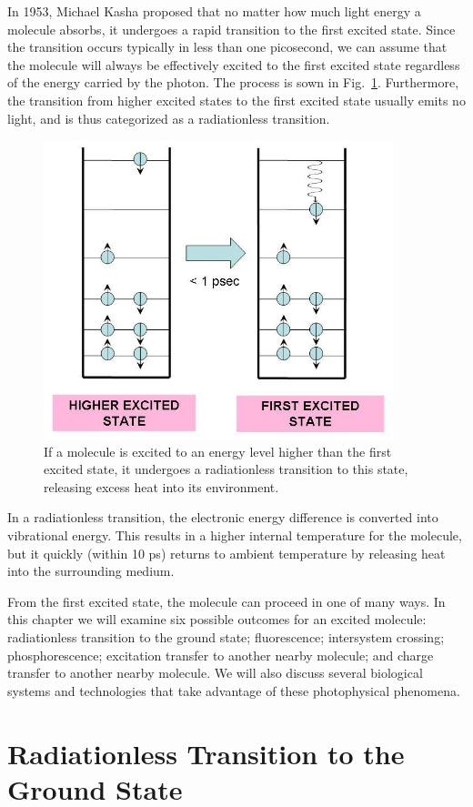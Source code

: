  In 1953, Michael Kasha proposed that no matter how much light energy a molecule absorbs, it undergoes a rapid transition to the first excited state.  Since the transition occurs typically in less than one picosecond, we can assume that the molecule will always be effectively excited to the first excited state regardless of the energy carried by the photon. The process is sown in Fig.~\ref{Fig7-1}. Furthermore, the transition from higher excited states to the first excited state usually emits no light, and is thus categorized as a radiationless transition.
\begin{figure}[h]
	\centering
	\includegraphics[width=4.0in]{./figures/Topic7/Fig7-1.jpg}
	\caption{If a molecule is excited to an energy level higher than the first excited state, it undergoes a radiationless transition to this state, releasing excess heat into its environment.}
	\label{Fig7-1}
\end{figure}
In a radiationless transition, the electronic energy difference is converted into vibrational energy.  This results in a higher internal temperature for the molecule, but it quickly (within 10 ps) returns to ambient temperature by releasing heat into the surrounding medium.

From the first excited state, the molecule can proceed in one of many ways.  In this chapter we will examine six possible outcomes for an excited molecule: radiationless transition to the ground state; fluorescence; intersystem crossing; phosphorescence; excitation transfer to another nearby molecule; and charge transfer to another nearby molecule.  We will also discuss several biological systems and technologies that take advantage of these photophysical phenomena.

\section{Radiationless Transition to the Ground State}

